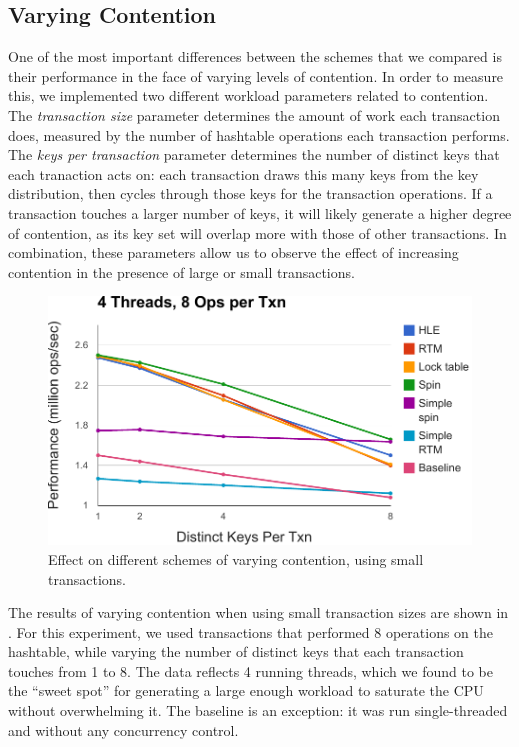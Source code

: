 \subsection{Varying Contention}

One of the most important differences between the schemes that we compared is
their performance in the face of varying levels of contention. In order to
measure this, we implemented two different workload parameters related to
contention. The \textit{transaction size} parameter determines the amount of
work each transaction does, measured by the number of hashtable operations each
transaction performs.  The \textit{keys per transaction} parameter determines
the number of distinct keys that each tranaction acts on: each transaction draws
this many keys from the key distribution, then cycles through those keys for the
transaction operations. If a transaction touches a larger number of keys, it
will likely generate a higher degree of contention, as its key set will overlap
more with those of other transactions. In combination, these parameters allow us
to observe the effect of increasing contention in the presence of large or small
transactions.

\begin{figure}[h!]
  \centering
  \includegraphics[scale=0.575]{figure/small_txns.pdf}
  \caption{Effect on different schemes of varying contention, using small
    transactions.}
  \label{fig:small_txns} 
\end{figure}

The results of varying contention when using small transaction sizes are shown
in . For this experiment, we used transactions that
performed 8 operations on the hashtable, while varying the number of distinct
keys that each transaction touches from 1 to 8. The data reflects 4 running
threads, which we found to be the ``sweet spot'' for generating a large enough
workload to saturate the CPU without overwhelming it. The baseline is an
exception: it was run single-threaded and without any concurrency control.

